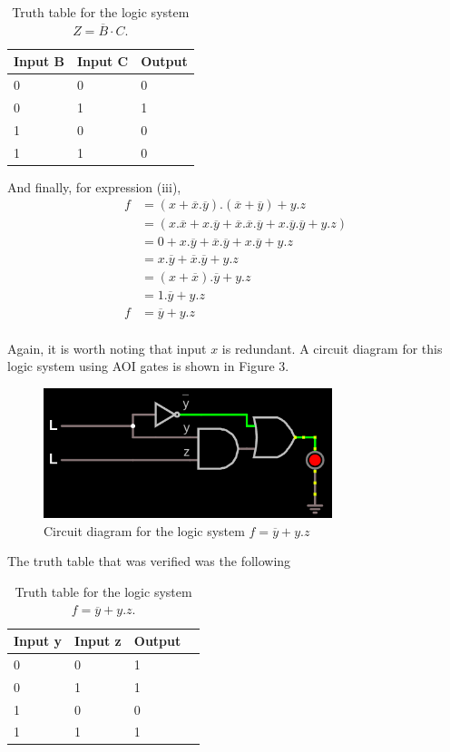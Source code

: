 \documentclass{article}
\newcommand{\ol}[1]{\overline{#1}}
\begin{document}
			\begin{table}[H]
		\centering
		\begin{tabular}{|l|l|l|}
			\hline
			Input B & Input C & Output\\
			\hline
			0 & 0 & 0\\
			0 & 1 & 1\\
			1 & 0 & 0\\
			1 & 1 & 0\\
			\hline
		\end{tabular}
		\caption{Truth table for the logic system $Z = \ol{B}\cdot C$.}
	\end{table}
And finally, for expression (iii),
 \begin{align*}
  f &= (x+\ol{x}.\ol{y}). (\ol{x} + \ol{y}) + y. z\\
   & = (x. \ol{x} + x.\ol{y} + \ol{x}.\ol{x}.\ol{y} + x. \ol{y}.\ol{y} + y. z)\\
   & = 0 + x. \ol{y} + \ol{x}.\ol{y} + x.\ol{y} + y. z\\
   & = x.\ol{y} + \ol{x}.\ol{y} + y.z\\
   & = (x+\ol{x}).\ol{y}+ y.z\\
   & = 1.\ol{y} + y.z\\
   f & = \ol{y} + y.z \tag{3}\\
 \end{align*}
   
 Again, it is worth noting that input $x$ is redundant. A circuit diagram for this logic system using AOI gates is shown in Figure 3.
 
 	\begin{figure}[H]
 	\centering
 	\includegraphics[width=0.75\textwidth]{three}
 	\caption{Circuit diagram for the logic system $f=\ol{y} + y.z$}
 	\label{circuit3}
 \end{figure}

  The truth table that was verified was the following
 
 		\begin{table}[H]
 	\centering
 	\begin{tabular}{|l|l|l|l|}
 		\hline
 		Input y & Input z & Output\\
 		\hline
 		0 & 0 & 1\\
 		0 & 1 & 1\\
 		1 & 0 & 0\\
 		1 & 1 & 1\\
 		\hline
 	\end{tabular}
 	\caption{Truth table for the logic system $f = \ol{y} + y.z$.}
 \end{table}
\end{document}
